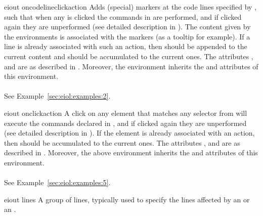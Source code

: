 \bigskip
\xmlstruct
{eiout}
{oncodelineclickaction}
{%
%
  Adds (special) markers at the code lines specified by
  , such that when any is clicked the
  commands in  are performed, and if
  clicked again they are unperformed (see detailed description in
  ).
  The content given by the  environments is
  associated with the markers (as a tooltip for example).
%
  If a line is already associated with such an action, then
   should be appended to the current
  content and  should be accumulated
  to the current ones.
%
  The attributes ,  and
   are as described in
  . Moreover, the
   environment inherits the
   and  attributes of this
  environment.
%
  \\\\See Example~\ref{sec:eiol:examples:2}.
}%

\bigskip
\xmlstruct
{eiout}
{onclickaction}
{%
%
  A click on any element that matches any selector from
   will execute the commands declared in
  , and if clicked again they are
  unperformed (see detailed description in
  ).
%
  If the element is already associated with an action, then
   should be accumulated to the
  current ones.
%
%
  The attributes ,  and
   are as described in
  . Moreover, the above
   environment inherits the
   and  attributes of this
  environment.
%
  \\\\See Example~\ref{sec:eiol:examples:5}.
}%




\bigskip
\xmlstruct
{eiout}
{lines}
{%
%
A group of lines, typically used to specify the lines affected by 
an  or an .
%
}


